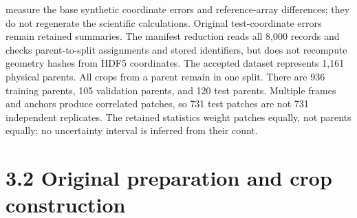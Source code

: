 \documentclass[11pt]{article}
\begin{document}
measure the base synthetic coordinate errors and reference-array differences; they do not regenerate
the scientific calculations. Original test-coordinate errors remain retained summaries. The manifest
reduction reads all 8,000 records and checks parent-to-split assignments and stored identifiers, but
does not recompute geometry hashes from HDF5 coordinates.
The accepted dataset represents 1,161 physical parents. All crops from a parent remain in one
split. There are 936 training parents, 105 validation parents, and 120 test parents. Multiple frames
and anchors produce correlated patches, so 731 test patches are not 731 independent replicates. The
retained statistics weight patches equally, not parents equally; no uncertainty interval is inferred
from their count.

\section*{3.2 Original preparation and crop construction}
\end{document}
